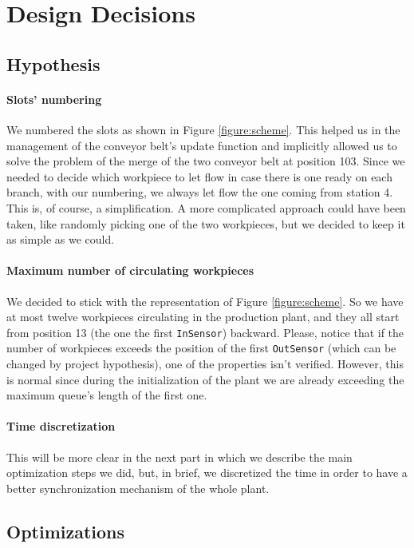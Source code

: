 \documentclass[a4paper]{article}
\newcommand{\figureref}[1]{Figure \ref{#1}}
\begin{document}
    \section{Design Decisions} \label{section:design_decisions}

    \subsection{Hypothesis}

    \paragraph{Slots' numbering} We numbered the slots as shown in \figureref{figure:scheme}. This helped us in the management of the conveyor belt's update function and implicitly allowed us to solve the problem of the merge of the two conveyor belt at position 103. Since we needed to decide which workpiece to let flow in case there is one ready on each branch, with our numbering, we always let flow the one coming from station 4. This is, of course, a simplification. A more complicated approach could have been taken, like randomly picking one of the two workpieces, but we decided to keep it as simple as we could.

    \paragraph{Maximum number of circulating workpieces} We decided to stick with the representation of \figureref{figure:scheme}. So we have at most twelve workpieces circulating in the production plant, and they all start from position 13 (the one the first \texttt{InSensor}) backward. Please, notice that if the number of workpieces exceeds the position of the first \texttt{OutSensor} (which can be changed by project hypothesis), one of the properties isn't verified. However, this is normal since during the initialization of the plant we are already exceeding the maximum queue's length of the first one.

    \paragraph{Time discretization} This will be more clear in the next part in which we describe the main optimization steps we did, but, in brief, we discretized the time in order to have a better synchronization mechanism of the whole plant.

    \subsection{Optimizations}
\end{document}
